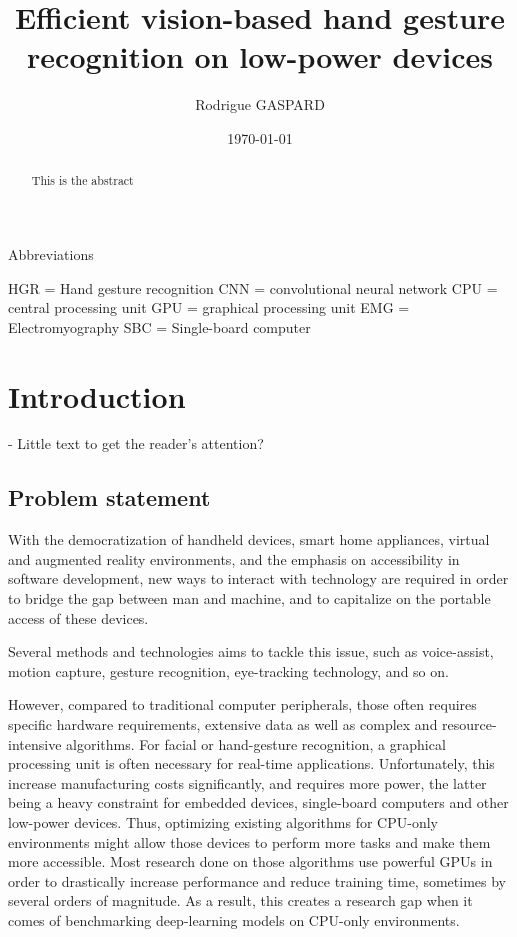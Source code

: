 \documentclass[12pt]{article}
\title{Efficient vision-based hand gesture recognition on low-power devices}
\author{Rodrigue GASPARD}
\date{\today}
\begin{document}
  \maketitle

  Abbreviations

  HGR = Hand gesture recognition
  CNN = convolutional neural network
  CPU = central processing unit
  GPU = graphical processing unit
  EMG = Electromyography
  SBC = Single-board computer

  \begin{abstract}
    This is the abstract
  \end{abstract}

  \section{Introduction}

  - Little text to get the reader's attention?

  \subsection{Problem statement}

  With the democratization of handheld devices, smart home appliances,  virtual and augmented reality environments, and the emphasis on accessibility in software development, new ways to interact with technology are required in order to bridge the gap between man and machine, and to capitalize on the portable access of these devices. 

  Several methods and technologies aims to tackle this issue, such as voice-assist, motion capture, gesture recognition, eye-tracking technology, and so on. 

  However, compared to traditional computer peripherals, those often requires specific hardware requirements, extensive data as well as complex and resource-intensive algorithms. For facial or hand-gesture recognition, a graphical processing unit is often necessary for real-time applications. Unfortunately, this increase manufacturing costs significantly, and requires more power, the latter being a heavy constraint for embedded devices, single-board computers and other low-power devices.
  Thus, optimizing existing algorithms for CPU-only environments might allow those devices to perform more tasks and make them more accessible. Most research done on those algorithms use powerful GPUs in order to drastically increase performance and reduce training time, sometimes by several orders of magnitude. As a result, this creates a research gap when it comes of benchmarking deep-learning models on CPU-only environments.
\end{document}
